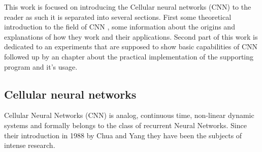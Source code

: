 This work is focused on introducing the Cellular neural networks (CNN) to the reader as such it is separated into several sections. First some theoretical introduction to the field of CNN , some information about the origins and explanations of how they work and their applications. Second part of this work is dedicated to an experiments that are supposed to show basic capabilities of CNN followed up by an chapter about the practical implementation of the supporting program and it's usage. 


\subsection{Cellular neural networks}
Cellular Neural Networks (CNN) is analog, continuous time, non-linear dynamic
systems and formally belongs to the class of recurrent Neural Networks. Since
their introduction in 1988 by Chua and Yang \cite{Chua-Yang} they have been the subjects of
intense research. \\
